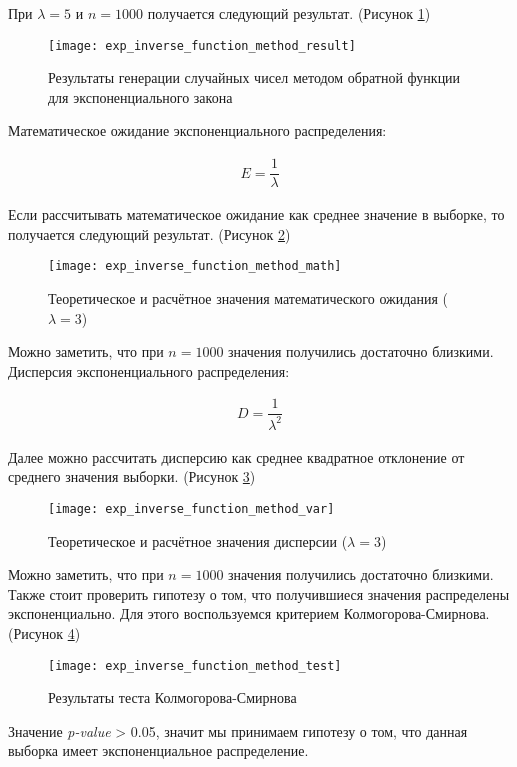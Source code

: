При $\lambda = 5$ и $n = 1000$ получается следующий результат. (Рисунок \ref{fig:exp_inverse_function_method_result})
\begin{figure}[h]
	\centering \texttt{[image: exp\_inverse\_function\_method\_result]}
	\caption{Результаты генерации случайных чисел методом обратной функции для экспоненциального закона}
	\label{fig:exp_inverse_function_method_result}
\end{figure}

Математическое ожидание экспоненциального распределения:
\begin{ceqn}
	\begin{align*}
		E = \dfrac{1}{\lambda}
	\end{align*}
\end{ceqn}
\newpage
Если рассчитывать математическое ожидание как среднее значение в выборке, то получается следующий результат. (Рисунок \ref{fig:exp_inverse_function_method_math})
\begin{figure}[h]
	\centering \texttt{[image: exp\_inverse\_function\_method\_math]}
	\caption{Теоретическое и расчётное значения математического ожидания ($\lambda = 3$)}
	\label{fig:exp_inverse_function_method_math}
\end{figure}

Можно заметить, что при $n = 1000$ значения получились достаточно близкими.\\
Дисперсия экспоненциального распределения:
\begin{ceqn}
	\begin{align*}
		D = \dfrac{1}{\lambda^2}
	\end{align*}
\end{ceqn}
Далее можно рассчитать дисперсию как среднее квадратное отклонение от среднего значения выборки. (Рисунок \ref{fig:exp_inverse_function_method_var})
\begin{figure}[h]
	\centering \texttt{[image: exp\_inverse\_function\_method\_var]}
	\caption{Теоретическое и расчётное значения дисперсии ($\lambda = 3$)}
	\label{fig:exp_inverse_function_method_var}
\end{figure}

Можно заметить, что при $n = 1000$ значения получились достаточно близкими.\\

Также стоит проверить гипотезу о том, что получившиеся значения распределены экспоненциально. Для этого воспользуемся критерием Колмогорова-Смирнова. (Рисунок \ref{fig:exp_inverse_function_method_test})
\begin{figure}[h]
	\centering \texttt{[image: exp\_inverse\_function\_method\_test]}
	\caption{Результаты теста Колмогорова-Смирнова}
	\label{fig:exp_inverse_function_method_test}
\end{figure}

Значение \textit{p-value} > 0.05, значит мы принимаем гипотезу о том, что данная выборка имеет экспоненциальное распределение.